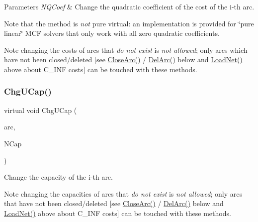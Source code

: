 \begin{DoxyParams}{Parameters}
{\em N\+Q\+Coef} & Change the quadratic coefficient of the cost of the i-\/th arc.\\
\hline
\end{DoxyParams}
Note that the method is {\itshape not} pure virtual\+: an implementation is provided for \char`\"{}pure linear\char`\"{} M\+CF solvers that only work with all zero quadratic coefficients.

\begin{DoxyNote}{Note}
changing the costs of arcs that {\itshape do not exist} is {\itshape not allowed}; only arcs which have not been closed/deleted \mbox{[}see \mbox{\hyperlink{class_m_c_f_class_ae1c33ba491b57343fbc157123fff5b11}{Close\+Arc()}} / \mbox{\hyperlink{class_m_c_f_class_ae291d6625ff31a5fdcc1ef166e2dee34}{Del\+Arc()}} below and \mbox{\hyperlink{class_m_c_f_class_a8d82d26f7845eb69081c860e14c3dc4c}{Load\+Net()}} above about C\+\_\+\+I\+NF costs\mbox{]} can be touched with these methods. 
\end{DoxyNote}
\mbox{\label{class_m_c_f_class_a832883594b6ea5a00fabc9f4be41d9e5}} 
\subsubsection{\texorpdfstring{Chg\+U\+Cap()}{ChgUCap()}}
{\footnotesize\ttfamily virtual void Chg\+U\+Cap (\begin{DoxyParamCaption}\item[{\mbox{\hyperlink{class_m_c_f_class_ad53d6229d7ec28555a9c9c2fd9abf773}{Index}}}]{arc,  }\item[{\mbox{\hyperlink{class_m_c_f_class_a11f747fbdff346237c8db4469d569994}{c\+F\+Number}}}]{N\+Cap }\end{DoxyParamCaption})\hspace{0.3cm}{\ttfamily [pure virtual]}}

Change the capacity of the i-\/th arc.

\begin{DoxyNote}{Note}
changing the capacities of arcs that {\itshape do not exist} is {\itshape not allowed}; only arcs that have not been closed/deleted \mbox{[}see \mbox{\hyperlink{class_m_c_f_class_ae1c33ba491b57343fbc157123fff5b11}{Close\+Arc()}} / \mbox{\hyperlink{class_m_c_f_class_ae291d6625ff31a5fdcc1ef166e2dee34}{Del\+Arc()}} below and \mbox{\hyperlink{class_m_c_f_class_a8d82d26f7845eb69081c860e14c3dc4c}{Load\+Net()}} above about C\+\_\+\+I\+NF costs\mbox{]} can be touched with these methods. 
\end{DoxyNote}


